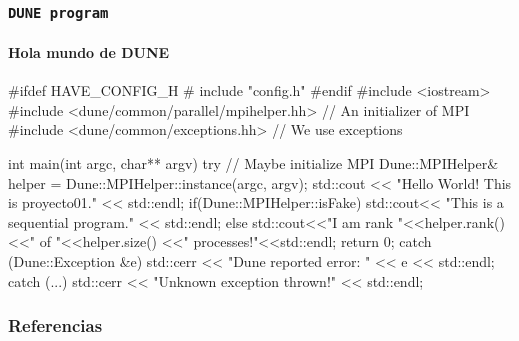 \begin{frame}[fragile]
	\frametitle{\lstinline{DUNE program}}
	\framesubtitle{Hola mundo de DUNE}
\small{
\begin{python}
	#ifdef HAVE_CONFIG_H # include "config.h"
	#endif 	#include <iostream>
	#include <dune/common/parallel/mpihelper.hh> // An initializer of MPI
	#include <dune/common/exceptions.hh> // We use exceptions
	
	int main(int argc, char** argv)
	{
	  try{
		// Maybe initialize MPI
		Dune::MPIHelper& helper = Dune::MPIHelper::instance(argc, argv);
		std::cout << "Hello World! This is proyecto01." << std::endl;
		if(Dune::MPIHelper::isFake)
		  std::cout<< "This is a sequential program." << std::endl;
		else
		  std::cout<<"I am rank "<<helper.rank()<<" of "<<helper.size()
			<<" processes!"<<std::endl;
		return 0;
	  }
	  catch (Dune::Exception &e){
		std::cerr << "Dune reported error: " << e << std::endl;
	  }
	  catch (...){
		std::cerr << "Unknown exception thrown!" << std::endl;
	  }
	}
\end{python}
}

\end{frame}

\begin{frame}\transblindsvertical
	\frametitle{Referencias}
\end{frame}


